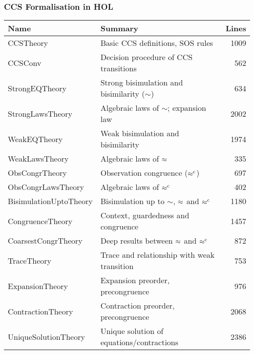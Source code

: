\begin{frame}
\frametitle{CCS Formalisation in HOL}
\begin{center}
\begin{small}
\begin{tabular}{|l|l|r|}
\hline
\textbf{Name} & \textbf{Summary} & \textbf{Lines} \\
\hline
CCSTheory & Basic CCS definitions, SOS rules & 1009 \\
CCSConv & Decision procedure of CCS transitions & 562 \\
StrongEQTheory & Strong bisimulation and bisimilarity ($\sim$) & 634 \\
StrongLawsTheory & Algebraic laws of $\sim$; expansion law & 2002 \\
WeakEQTheory & Weak bisimulation and bisimilarity & 1974 \\
WeakLawsTheory & Algebraic laws of $\approx$ & 335 \\
ObsCongrTheory & Observation congruence ($\mathrel{\approx^{\mathrm{c}}}$) & 697 \\
ObsCongrLawsTheory & Algebraic laws of $\mathrel{\approx^{\mathrm{c}}}$ & 402 \\
\hline
BisimulationUptoTheory & Bisimulation up to $\sim$, $\approx$ and $\mathrel{\approx^{\mathrm{c}}}$ & 1180 \\
CongruenceTheory & Context, guardedness and congruence & 1457 \\
CoarsestCongrTheory & Deep results between $\approx$ and $\mathrel{\approx^{\mathrm{c}}}$ & 872 \\
TraceTheory & Trace and relationship with weak transition & 753 \\
ExpansionTheory & Expansion preorder, precongruence & 976 \\
ContractionTheory & Contraction preorder, precongruence & 2068 \\
UniqueSolutionTheory & Unique solution of equations/contractions & 2386 \\
\hline
\end{tabular}
\end{small}
\end{center}
\end{frame}

\def\HOL{\textsc{Hol}}
\newcommand\fun{{\to}}
\newcommand\prd{{\times}}
\newcommand{\ty}[1]{\textsl{#1}}
\newcommand\conj{\ \wedge\ }
\newcommand\disj{\ \vee\ }
\newcommand\imp{ \Rightarrow }
\newcommand\eqv{\ \equiv\ }
\newcommand\vbar{\mid}
\newcommand\turn{\ \vdash\ } %
\newcommand\hilbert{\varepsilon}
\newcommand{\uquant}[1]{\forall #1.\ }
\newcommand{\equant}[1]{\exists #1.\ }
\newcommand{\hquant}[1]{\hilbert #1.\ }
\newcommand{\iquant}[1]{\exists ! #1.\ }
\newcommand{\lquant}[1]{\lambda #1.\ }
\newcommand{\ml}[1]{\mbox{{\def\_{\char'137}\texttt{#1}}}}
\newcommand{\con}[1]{\mathrm{#1}}

